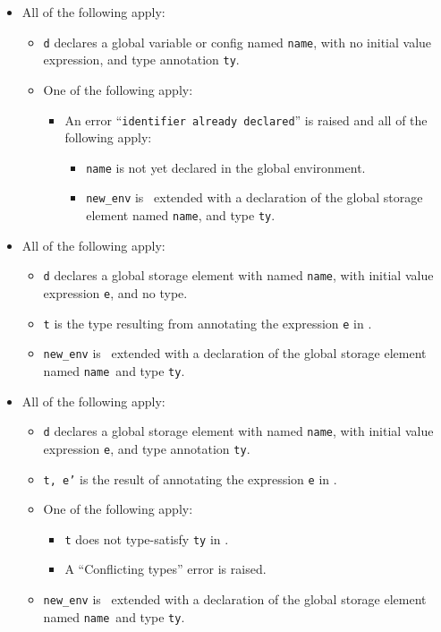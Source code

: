 \documentclass{book}
\newcommand\name[0]{\texttt{name}}
\begin{document}
\begin{itemize}
  \item All of the following apply:
  \begin{itemize}
    \item \texttt{d} declares a global variable or config named \name, with no initial value expression, and type annotation \texttt{ty}.
    \item One of the following apply:
    \begin{itemize}
      \item An error ``\texttt{identifier already declared}'' is raised and all of the following apply:
      \begin{itemize}
        \item \texttt{name} is not yet declared in the global environment.
        \item \texttt{new\_env} is \tenv\ extended with a declaration of the global storage element named \name, and type \texttt{ty}.
      \end{itemize}
    \end{itemize}
  \end{itemize}

  \item All of the following apply:
  \begin{itemize}
    \item \texttt{d} declares a global storage element with named \name, with initial value expression \texttt{e}, and no type.
    \item \texttt{t} is the type resulting from annotating the expression \texttt{e} in \tenv.
    \item \texttt{new\_env} is \tenv\ extended with a declaration of the global storage element named \name\ and type \texttt{ty}.
  \end{itemize}

  \item All of the following apply:
  \begin{itemize}
    \item \texttt{d} declares a global storage element with named \name, with initial value expression \texttt{e}, and type annotation \texttt{ty}.
    \item \texttt{t, e'} is the result of annotating the expression \texttt{e} in \tenv.
    \item One of the following apply:
    \begin{itemize}
      \item \texttt{t} does not type-satisfy \texttt{ty} in \tenv.
      \item A ``Conflicting types'' error is raised.
    \end{itemize}
    \item \texttt{new\_env} is \tenv\ extended with a declaration of the global storage element named \name\ and type \texttt{ty}.
  \end{itemize}
\end{itemize}
\end{document}
